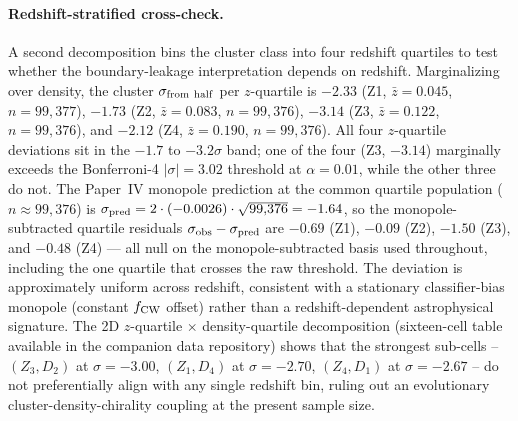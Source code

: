 \documentclass[aps,prd,twocolumn,superscriptaddress,showpacs,preprintnumbers,nofootinbib,longbibliography,floatfix]{revtex4-2}
\begin{document}
\paragraph{Redshift-stratified cross-check.} A second decomposition
bins the cluster class into four redshift quartiles to test whether
the boundary-leakage interpretation depends on redshift. Marginalizing
over density, the cluster $\sigma_{\rm from\ half}$ per
$z$-quartile is $-2.33$ (Z1, $\bar z = 0.045$, $n = 99{,}377$),
$-1.73$ (Z2, $\bar z = 0.083$, $n = 99{,}376$), $-3.14$ (Z3,
$\bar z = 0.122$, $n = 99{,}376$), and $-2.12$ (Z4, $\bar z = 0.190$,
$n = 99{,}376$). All four $z$-quartile deviations sit in the
$-1.7$ to $-3.2\sigma$ band; one of the four (Z3, $-3.14$)
marginally exceeds the Bonferroni-4 $|\sigma| = 3.02$ threshold at
$\alpha = 0.01$, while the other three do not. The Paper~IV monopole
prediction at the common quartile population ($n \approx 99{,}376$)
is $\sigma_{\rm pred} = 2 \cdot (-0.0026) \cdot \sqrt{99{,}376}
= -1.64$, so the monopole-subtracted quartile residuals
$\sigma_{\rm obs} - \sigma_{\rm pred}$ are $-0.69$ (Z1), $-0.09$
(Z2), $-1.50$ (Z3), and $-0.48$ (Z4) — all null on the
monopole-subtracted basis used throughout, including the one
quartile that crosses the raw threshold. The
deviation is approximately uniform across redshift, consistent with
a stationary classifier-bias monopole (constant $f_{\rm CW}$ offset)
rather than a redshift-dependent astrophysical signature.
The 2D $z$-quartile $\times$ density-quartile decomposition
(sixteen-cell table available in the companion data repository) shows that the strongest
sub-cells -- $(Z_3, D_2)$ at $\sigma = -3.00$, $(Z_1, D_4)$ at
$\sigma = -2.70$, $(Z_4, D_1)$ at $\sigma = -2.67$ -- do not
preferentially align with any single redshift bin, ruling out an
evolutionary cluster-density-chirality coupling at the present
sample size.
\end{document}
